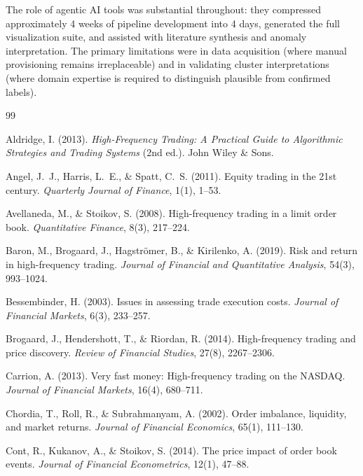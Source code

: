 \documentclass[11pt, letterpaper]{article}
\begin{document}
The role of agentic AI tools was substantial throughout:
they compressed approximately 4 weeks of pipeline development into 4 days,
generated the full visualization suite, and assisted with literature synthesis
and anomaly interpretation.
The primary limitations were in data acquisition (where manual provisioning
remains irreplaceable) and in validating cluster interpretations (where
domain expertise is required to distinguish plausible from confirmed labels).

\begin{thebibliography}{99}

Aldridge, I. (2013).
\textit{High-Frequency Trading: A Practical Guide to Algorithmic Strategies and
Trading Systems} (2nd ed.).
John Wiley \& Sons.

Angel, J.~J., Harris, L.~E., \& Spatt, C.~S. (2011).
Equity trading in the 21st century.
\textit{Quarterly Journal of Finance}, 1(1), 1--53.

Avellaneda, M., \& Stoikov, S. (2008).
High-frequency trading in a limit order book.
\textit{Quantitative Finance}, 8(3), 217--224.

Baron, M., Brogaard, J., Hagstr\"omer, B., \& Kirilenko, A. (2019).
Risk and return in high-frequency trading.
\textit{Journal of Financial and Quantitative Analysis}, 54(3), 993--1024.

Bessembinder, H. (2003).
Issues in assessing trade execution costs.
\textit{Journal of Financial Markets}, 6(3), 233--257.

Brogaard, J., Hendershott, T., \& Riordan, R. (2014).
High-frequency trading and price discovery.
\textit{Review of Financial Studies}, 27(8), 2267--2306.

Carrion, A. (2013).
Very fast money: High-frequency trading on the NASDAQ.
\textit{Journal of Financial Markets}, 16(4), 680--711.

Chordia, T., Roll, R., \& Subrahmanyam, A. (2002).
Order imbalance, liquidity, and market returns.
\textit{Journal of Financial Economics}, 65(1), 111--130.

Cont, R., Kukanov, A., \& Stoikov, S. (2014).
The price impact of order book events.
\textit{Journal of Financial Econometrics}, 12(1), 47--88.


\end{thebibliography}
\end{document}
